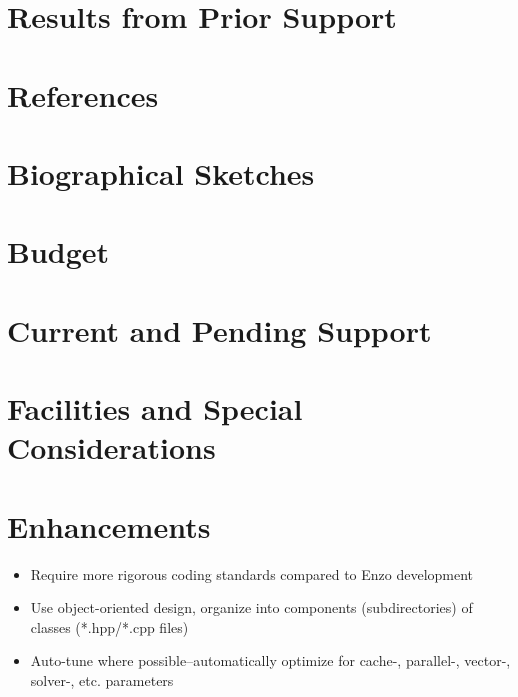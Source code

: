 \documentclass{article}
\begin{document}
\section{Results from Prior Support}
\section{References}
\section{Biographical Sketches}
\section{Budget}
\section{Current and Pending Support}
\section{Facilities and Special Considerations}

\section{Enhancements}

\begin{itemize}
 \item Require more rigorous coding standards compared to Enzo development
 \item Use object-oriented design, organize into components (subdirectories) of classes (*.hpp/*.cpp files)
 \item Auto-tune where possible--automatically optimize for cache-, parallel-, vector-, solver-, etc. parameters
\end{itemize}
\end{document}

